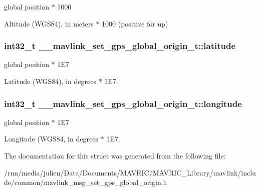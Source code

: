 global position $\ast$ 1000 

Altitude (W\+G\+S84), in meters $\ast$ 1000 (positive for up) \hypertarget{struct____mavlink__set__gps__global__origin__t_aae0adf1cfbd99eef18d9d43fdb0418dd}{
\subsubsection[{latitude}]{\setlength{\rightskip}{0pt plus 5cm}int32\+\_\+t \+\_\+\+\_\+mavlink\+\_\+set\+\_\+gps\+\_\+global\+\_\+origin\+\_\+t\+::latitude}}\label{struct____mavlink__set__gps__global__origin__t_aae0adf1cfbd99eef18d9d43fdb0418dd}


global position $\ast$ 1\+E7 

Latitude (W\+G\+S84), in degrees $\ast$ 1\+E7. \hypertarget{struct____mavlink__set__gps__global__origin__t_a1558c474ba2b7f246bb22f170677f4d3}{
\subsubsection[{longitude}]{\setlength{\rightskip}{0pt plus 5cm}int32\+\_\+t \+\_\+\+\_\+mavlink\+\_\+set\+\_\+gps\+\_\+global\+\_\+origin\+\_\+t\+::longitude}}\label{struct____mavlink__set__gps__global__origin__t_a1558c474ba2b7f246bb22f170677f4d3}


global position $\ast$ 1\+E7 

Longitude (W\+G\+S84, in degrees $\ast$ 1\+E7. 

The documentation for this struct was generated from the following file\+:\begin{DoxyCompactItemize}
\item 
/run/media/julien/\+Data/\+Documents/\+M\+A\+V\+R\+I\+C/\+M\+A\+V\+R\+I\+C\+\_\+\+Library/mavlink/include/common/mavlink\+\_\+msg\+\_\+set\+\_\+gps\+\_\+global\+\_\+origin.\+h\end{DoxyCompactItemize}
